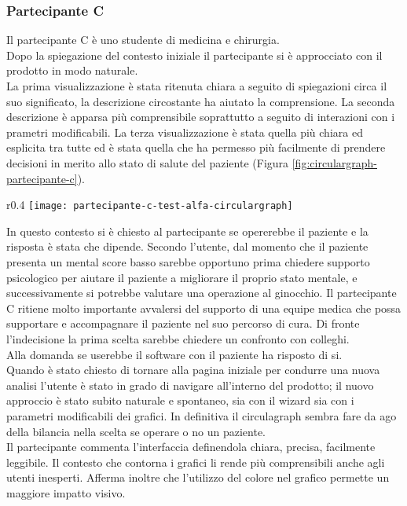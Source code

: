\subsubsection{Partecipante C}
Il partecipante C è uno studente di medicina e chirurgia. \\
Dopo la spiegazione del contesto iniziale il partecipante si è approcciato con il prodotto in modo naturale.\\
La prima visualizzazione è stata ritenuta chiara a seguito di spiegazioni circa il suo significato, la descrizione circostante ha aiutato la comprensione. La seconda descrizione è apparsa più comprensibile soprattutto a seguito di interazioni con i prametri modificabili. La terza visualizzazione è stata quella più chiara ed esplicita tra tutte ed è stata quella che ha permesso più facilmente di prendere decisioni in merito allo stato di salute del paziente (Figura \ref{fig:circulargraph-partecipante-c}). 
\begin{wrapfigure}{r}{0.4\textwidth}
    \centering
    \texttt{[image: partecipante-c-test-alfa-circulargraph]}
    \caption{Circulargraph del test Alfa condotto dal partecipante C}
    \caption*{In questo test si è indagato l'ambito dell'operazione al ginocchio}
    \label{fig:circulargraph-partecipante-c}
\end{wrapfigure}
In questo contesto si è chiesto al partecipante se opererebbe il paziente e la risposta è stata che dipende. Secondo l'utente, dal momento che il paziente presenta un mental score basso sarebbe opportuno prima chiedere supporto psicologico per aiutare il paziente a migliorare il proprio stato mentale, e successivamente si potrebbe valutare una operazione al ginocchio. Il partecipante C ritiene molto importante avvalersi del supporto di una equipe medica che possa supportare e accompagnare il paziente nel suo percorso di cura. Di fronte l'indecisione la prima scelta sarebbe chiedere un confronto con colleghi. \\
Alla domanda se userebbe il software con il paziente ha risposto di si. \\
Quando è stato chiesto di tornare alla pagina iniziale per condurre una nuova analisi l'utente è stato in grado di navigare all'interno del prodotto; il nuovo approccio è stato subito naturale e spontaneo, sia con il wizard sia con i parametri modificabili dei grafici. In definitiva il circulagraph sembra fare da ago della bilancia nella scelta se operare o no un paziente. \\
Il partecipante commenta l'interfaccia definendola chiara, precisa, facilmente leggibile. Il contesto che contorna i grafici li rende più comprensibili anche agli utenti inesperti. Afferma inoltre che l'utilizzo del colore nel grafico permette un maggiore impatto visivo. 